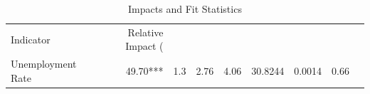 \begin{table}[!h]
\centering
\caption{Impacts and Fit Statistics}
\centering
\begin{tabular}[t]{lrrrrrrr}
\toprule
Indicator & Relative Impact (%
\midrule
{} &  &  &  &  &  &  & \\
Unemployment Rate & 49.70*** & 1.3 & 2.76 & 4.06 & 30.8244 & 0.0014 & 0.66\\
\bottomrule
\end{tabular}
\end{table}
